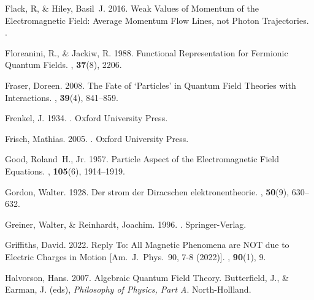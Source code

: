 \documentclass[onecolumn,secnumarabic,amsmath,amssymb,balancelastpage,nofootinbib,12pt]{article}
\begin{document}
\begin{thebibliography}{}
Flack, R, \& Hiley, Basil~J. 2016.
\newblock Weak Values of Momentum of the Electromagnetic Field: Average
  Momentum Flow Lines, not Photon Trajectories.
.

Floreanini, R., \& Jackiw, R. 1988.
\newblock Functional Representation for Fermionic Quantum Fields.
, {\bf 37}(8), 2206.

Fraser, Doreen. 2008.
\newblock The Fate of `Particles' in Quantum Field Theories with Interactions.
, {\bf
  39}(4), 841--859.

Frenkel, J. 1934.
.
\newblock Oxford University Press.

Frisch, Mathias. 2005.
.
\newblock Oxford University Press.

Good, Roland~H., Jr. 1957.
\newblock Particle Aspect of the Electromagnetic Field Equations.
, {\bf 105}(6), 1914--1919.

Gordon, Walter. 1928.
\newblock Der strom der Diracschen elektronentheorie.
, {\bf 50}(9), 630--632.

Greiner, Walter, \& Reinhardt, Joachim. 1996.
.
\newblock Springer-Verlag.

Griffiths, David. 2022.
\newblock Reply To: All Magnetic Phenomena are NOT due to Electric Charges in
  Motion [Am.\ J.\ Phys.\ 90, 7-8 (2022)].
, {\bf 90}(1), 9.

Halvorson, Hans. 2007.
\newblock Algebraic Quantum Field Theory.
 Butterfield, J., \& Earman, J. (eds), {\em
  Philosophy of Physics, Part A}.
\newblock North-Hollland.


\end{thebibliography}
\end{document}
